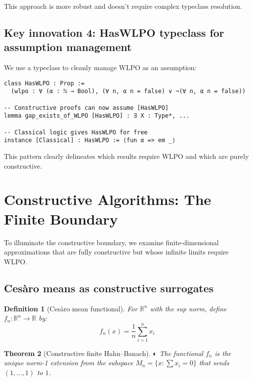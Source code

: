 \documentclass[11pt]{article}  %
\newtheorem{theorem}{Theorem}[section]
\newtheorem{definition}[theorem]{Definition}
\newenvironment{thm}{\begin{theorem}}{\end{theorem}}
\newenvironment{defi}{\begin{definition}}{\end{definition}}
\newcommand{\leanpartial}{\textsf{\small \textcolor{orange!80!black}{◐}}}
\newcommand{\R}{\mathbb{R}}
\newcommand{\WLPO}{\mathrm{WLPO}}
\begin{document}
This approach is more robust and doesn't require complex typeclass resolution.

\subsection{Key innovation 4: HasWLPO typeclass for assumption management}

We use a typeclass to cleanly manage $\WLPO$ as an assumption:

\begin{lstlisting}[caption={HasWLPO typeclass pattern}]
class HasWLPO : Prop :=
  (wlpo : ∀ (α : ℕ → Bool), (∀ n, α n = false) ∨ ¬(∀ n, α n = false))

-- Constructive proofs can now assume [HasWLPO]
lemma gap_exists_of_WLPO [HasWLPO] : ∃ X : Type*, ...

-- Classical logic gives HasWLPO for free  
instance [Classical] : HasWLPO := ⟨fun α => em _⟩
\end{lstlisting}

This pattern clearly delineates which results require $\WLPO$ and which are purely constructive.

\section{Constructive Algorithms: The Finite Boundary}

To illuminate the constructive boundary, we examine finite-dimensional approximations that are fully constructive but whose infinite limits require $\WLPO$.

\subsection{Ces\`aro means as constructive surrogates}

\begin{defi}[Ces\`aro mean functional]
For $\R^n$ with the sup norm, define $f_n:\R^n\to\R$ by:
\[
f_n(x) = \frac{1}{n}\sum_{i=1}^n x_i
\]
\end{defi}

\begin{thm}[Constructive finite Hahn--Banach]\label{thm:finite-hb}\leanpartial
The functional $f_n$ is the unique norm-1 extension from the subspace $M_n=\{x:\sum x_i=0\}$ that sends $(1,\dots,1)$ to $1$.
\end{thm}
\end{document}
